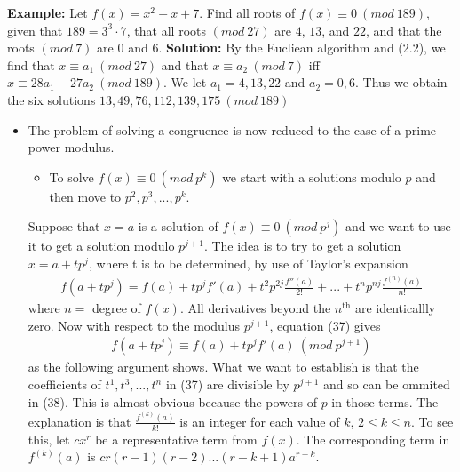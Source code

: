 \documentclass[a4paper]{article}
\begin{document}
\textbf{Example:}
Let $f(x)=x^2+x+7$. Find all roots of $f(x)\equiv 0\ (mod\ 189)$, given that $189=3^3\cdot7$, that all roots $(mod\ 27)$ are $4$, $13$, and $22$, and that the roots $(mod\ 7)$ are $0$ and $6$.
\textbf{Solution:}
By the Eucliean algorithm and (2.2), we find that $x\equiv a_1\ (mod\ 27)$ and that $x\equiv a_2\ (mod\ 7)$ iff $x\equiv 28a_1-27a_2\ (mod\ 189)$. We let $a_1=4, 13, 22$ and $a_2=0, 6$. Thus we obtain the six solutions $13, 49, 76, 112, 139, 175\ (mod\ 189)$
\begin{itemize}
    \item The problem of solving a congruence is now reduced to the case of a prime-power modulus.
    \begin{itemize}
        \item To solve $f(x)\equiv 0\ (mod\ p^k)$ we start with a solutions modulo $p$ and then move to $p^2, p^3,...,p^k$.
    \end{itemize}
    Suppose that $x=a$ is a solution of $f(x)\equiv 0\ (mod\ p^j)$ and we want to use it to get a solution modulo $p^{j+1}$. The idea is to try to get a solution $x=a+tp^j$, where t is to be determined, by use of Taylor's expansion
    \begin{align}
        f(a+tp^j)=f(a)+tp^jf'(a)+t^2p^{2j}\frac{f''(a)}{2!}+...+t^np^{nj}\frac{f^{(n)}(a)}{n!}
    \end{align}
    where $n=$ degree of $f(x)$. All derivatives beyond the $n^\text{th}$ are identicallly zero. Now with respect to the modulus $p^{j+1}$, equation (37) gives
    \begin{align*}
        f(a+tp^j)\equiv f(a)+tp^jf'(a)\ (mod\ p^{j+1})
    \end{align*}
    as the following argument shows. What we want to establish is that the coefficients of $t^1, t^3,..., t^n$ in (37) are divisible by $p^{j+1}$ and so can be ommited in (38). This is almost obvious because the powers of $p$ in those terms. The explanation is that $\frac{f^{(k)}(a)}{k!}$ is an integer for each value of $k$, $2\leq k\leq n$. To see this, let  $cx^r$ be a representative term from $f(x)$. The corresponding term in $f^{(k)}(a)$ is $cr(r-1)(r-2)...(r-k+1)a^{r-k}$.



\end{itemize}
\end{document}
